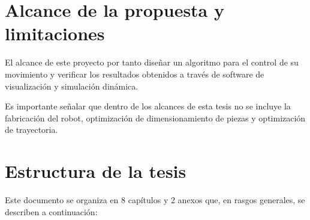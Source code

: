 \newpage


\section{Alcance de la propuesta y limitaciones}

El alcance de este proyecto por tanto diseñar un algoritmo para el control de su movimiento y verificar los resultados obtenidos a través de software de visualización y simulación dinámica.

Es importante señalar que dentro de los alcances de esta tesis no se incluye la fabricación del robot, optimización de dimensionamiento de piezas y  optimización de trayectoria.


\section{Estructura de la tesis}

Este documento se organiza en 8 capítulos y 2 anexos que, en rasgos generales, se describen a continuación:

